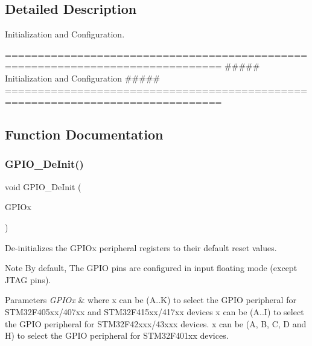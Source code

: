 \subsection{Detailed Description}
Initialization and Configuration. 

\begin{DoxyVerb} ===============================================================================
                 ##### Initialization and Configuration #####
 ===============================================================================  \end{DoxyVerb}
 

\subsection{Function Documentation}
\mbox{\label{group___g_p_i_o___group1_gaa60bdf3182c44b5fa818f237042f52ee}} 
\subsubsection{\texorpdfstring{G\+P\+I\+O\+\_\+\+De\+Init()}{GPIO\_DeInit()}}
{\footnotesize\ttfamily void G\+P\+I\+O\+\_\+\+De\+Init (\begin{DoxyParamCaption}\item[{G\+P\+I\+O\+\_\+\+Type\+Def $\ast$}]{G\+P\+I\+Ox }\end{DoxyParamCaption})}



De-\/initializes the G\+P\+I\+Ox peripheral registers to their default reset values. 

\begin{DoxyNote}{Note}
By default, The G\+P\+IO pins are configured in input floating mode (except J\+T\+AG pins). 
\end{DoxyNote}

\begin{DoxyParams}{Parameters}
{\em G\+P\+I\+Ox} & where x can be (A..K) to select the G\+P\+IO peripheral for S\+T\+M32\+F405xx/407xx and S\+T\+M32\+F415xx/417xx devices x can be (A..I) to select the G\+P\+IO peripheral for S\+T\+M32\+F42xxx/43xxx devices. x can be (A, B, C, D and H) to select the G\+P\+IO peripheral for S\+T\+M32\+F401xx devices. ~\newline
\\
\hline
\end{DoxyParams}


